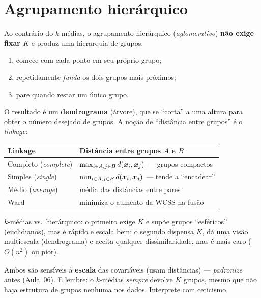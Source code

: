 \documentclass[11pt,a4paper]{article}
\begin{document}
\section{Agrupamento hierárquico}
Ao contrário do $k$-médias, o agrupamento hierárquico (\emph{aglomerativo})
\textbf{não exige fixar $K$} e produz uma hierarquia de grupos:
\begin{enumerate}[leftmargin=1.6cm,nosep]
  \item comece com cada ponto em seu próprio grupo;
  \item repetidamente \emph{funda} os dois grupos mais próximos;
  \item pare quando restar um único grupo.
\end{enumerate}
O resultado é um \textbf{dendrograma} (árvore), que se ``corta'' a uma altura para
obter o número desejado de grupos. A noção de ``distância entre grupos'' é o
\emph{linkage}:
\begin{center}\small
\renewcommand{\arraystretch}{1.25}
\begin{tabular}{@{}ll@{}}
\toprule
\textbf{Linkage} & \textbf{Distância entre grupos $A$ e $B$} \\
\midrule
Completo (\emph{complete}) & $\max_{i\in A,j\in B} d(\bm{x}_i,\bm{x}_j)$ --- grupos compactos \\
Simples (\emph{single})    & $\min_{i\in A,j\in B} d(\bm{x}_i,\bm{x}_j)$ --- tende a ``encadear'' \\
Médio (\emph{average})     & média das distâncias entre pares \\
Ward                       & minimiza o aumento da WCSS na fusão \\
\bottomrule
\end{tabular}
\end{center}

\begin{ideia}
$k$-médias vs.\ hierárquico: o primeiro exige $K$ e supõe grupos ``esféricos''
(euclidianos), mas é rápido e escala bem; o segundo dispensa $K$, dá uma visão
multiescala (dendrograma) e aceita qualquer dissimilaridade, mas é mais caro
($O(n^2)$ ou pior).
\end{ideia}

\begin{atencao}
Ambos são sensíveis à \textbf{escala} das covariáveis (usam distâncias) ---
\emph{padronize} antes (Aula~06). E lembre: o $k$-médias \emph{sempre} devolve $K$
grupos, mesmo que não haja estrutura de grupos nenhuma nos dados. Interprete com
ceticismo.
\end{atencao}
\end{document}
